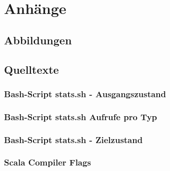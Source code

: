\chapter*{Anhänge}
\label{chap:APPENDIX}
\renewcommand\thesection{A.\arabic{section}}
\renewcommand\thesubsection{\thesection.\arabic{subsection}}

\setcounter{page}{1}
\renewcommand{\thepage}{A-\arabic{page}}

\section{Abbildungen}
\label{sec:APPENDIX_FIGURES}

\section{Quelltexte}
\label{sec:APPENDIX_LISTINGS}

\renewcommand{\baselinestretch}{1}

\subsection{Bash-Script stats.sh - Ausgangszustand}
\label{subsec:APPENDIX_LISTINGS_STATS_OLD}


\subsection{Bash-Script stats.sh Aufrufe pro Typ}
\label{subsec:APPENDIX_LISTINGS_STATS_EXECS}


\subsection{Bash-Script stats.sh - Zielzustand}
\label{subsec:APPENDIX_LISTINGS_STATS_NEW}


\subsection{Scala Compiler Flags}
\label{subsec:APPENDIX_LISTINGS_SCALAC_FLAGS}


